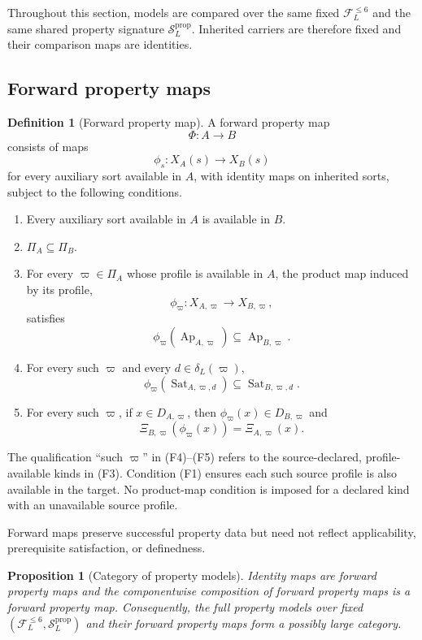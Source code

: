\documentclass[11pt]{article}
\newcommand{\FVI}{\mathcal F_{L}^{\le 6}}
\newcommand{\Sprop}{\mathcal S_{L}^{\mathrm{prop}}}
\newcommand{\Ap}{\operatorname{Ap}}
\newcommand{\Sat}{\operatorname{Sat}}
\newtheorem{proposition}[theorem]{Proposition}
\theoremstyle{definition}
\newtheorem{definition}[theorem]{Definition}
\theoremstyle{remark}
\begin{document}
Throughout this section, models are compared over the same fixed \(\FVI\) and the same shared property signature \(\Sprop\).
Inherited carriers are therefore fixed and their comparison maps are identities.

\subsection{Forward property maps}

\begin{definition}[Forward property map]
\label{def:forward-map}
A forward property map
\[
\Phi:A\longrightarrow B
\]
consists of maps
\[
\phi_s:X_A(s)\longrightarrow X_B(s)
\]
for every auxiliary sort available in \(A\), with identity maps on inherited sorts, subject to the following conditions.
\begin{enumerate}[label=(F\arabic*)]
\item Every auxiliary sort available in \(A\) is available in \(B\).
\item \(\Pi_A\subseteq\Pi_B\).
\item For every \(\varpi\in\Pi_A\) whose profile is available in \(A\), the product map induced by its profile,
\[
\phi_{\varpi}:X_{A,\varpi}\longrightarrow X_{B,\varpi},
\]
satisfies
\[
\phi_{\varpi}(\Ap_{A,\varpi})\subseteq\Ap_{B,\varpi}.
\]
\item For every such \(\varpi\) and every \(d\in\delta_L(\varpi)\),
\[
\phi_{\varpi}(\Sat_{A,\varpi,d})\subseteq\Sat_{B,\varpi,d}.
\]
\item For every such \(\varpi\), if \(x\in D_{A,\varpi}\), then \(\phi_{\varpi}(x)\in D_{B,\varpi}\) and
\[
\Xi_{B,\varpi}(\phi_{\varpi}(x))=\Xi_{A,\varpi}(x).
\]
\end{enumerate}
The qualification ``such \(\varpi\)'' in (F4)--(F5) refers to the source-declared, profile-available kinds in (F3).
Condition (F1) ensures each such source profile is also available in the target.
No product-map condition is imposed for a declared kind with an unavailable source profile.
\end{definition}

Forward maps preserve successful property data but need not reflect applicability, prerequisite satisfaction, or definedness.

\begin{proposition}[Category of property models]
Identity maps are forward property maps and the componentwise composition of forward property maps is a forward property map.
Consequently, the full property models over fixed \((\FVI,\Sprop)\) and their forward property maps form a possibly large category.
\end{proposition}
\end{document}
